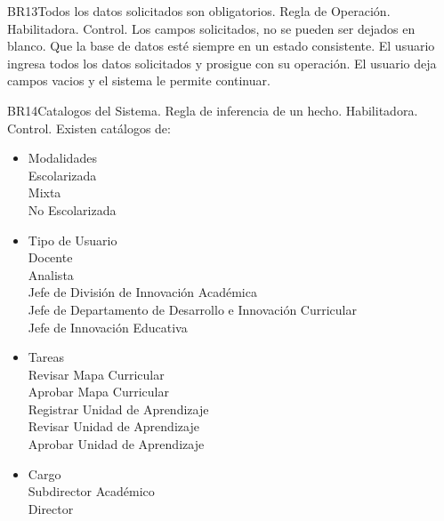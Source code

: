 \begin{BussinesRule}{BR13}{Todos los datos solicitados son obligatorios.}
    \BRitem[Tipo:] Regla de Operación.
    \BRitem[Clase:] Habilitadora.
    \BRitem[Nivel:] Control.
    \BRitem[Descripción:] Los campos solicitados, no se pueden ser dejados en blanco.
    \BRitem[Sentencia:]
    \BRitem[Motivación: ]Que la base de datos esté siempre en un estado consistente.
     El usuario ingresa todos los datos solicitados y prosigue con su operación.
    El usuario deja campos vacios y el sistema le permite continuar.
\end{BussinesRule}
\begin{BussinesRule}{BR14}{Catalogos del Sistema.}
    \BRitem[Tipo: ]Regla de inferencia de un hecho.
    \BRitem[Clase: ]Habilitadora.
    \BRitem[Nivel: ]Control.
    \BRitem[Descripción: ]Existen catálogos de:
    \begin{itemize}
        \item Modalidades\\
            Escolarizada\\
            Mixta\\
            No Escolarizada
        \item Tipo de Usuario\\
            Docente\\
            Analista\\
            Jefe de División de Innovación Académica\\
            Jefe de Departamento de Desarrollo e Innovación Curricular\\
            Jefe de Innovación Educativa
        \item Tareas\\
            Revisar Mapa Curricular\\
            Aprobar Mapa Curricular\\
            Registrar Unidad de Aprendizaje\\
            Revisar Unidad de Aprendizaje\\
            Aprobar Unidad de Aprendizaje
        \item Cargo\\
            Subdirector Académico\\
            Director\\

\end{itemize}
\end{BussinesRule}
